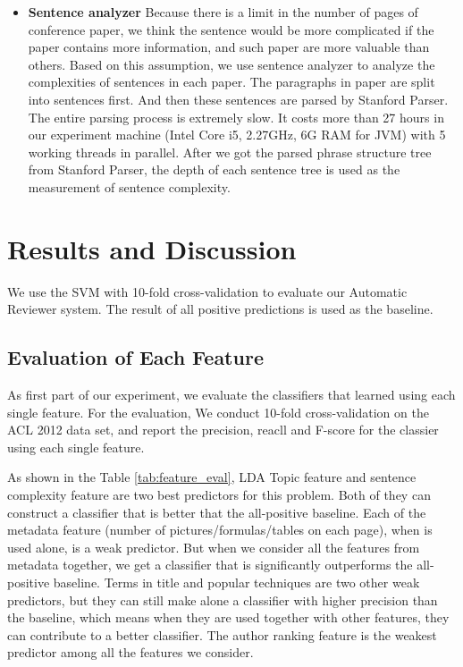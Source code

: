 \documentclass[11pt,letterpaper]{article}
\begin{document}
\begin{itemize}
\item	{\bf Sentence analyzer}
Because there is a limit in the number of pages of conference paper, we think the sentence would be more complicated if the paper contains more information, and such paper are more valuable than others. Based on this assumption, we use sentence analyzer to analyze the complexities of sentences in each paper. The paragraphs in paper are split into sentences first. And then these sentences are parsed by Stanford Parser. The entire parsing process is extremely slow. It costs more than 27 hours in our experiment machine (Intel Core i5, 2.27GHz, 6G RAM for JVM) with 5 working threads in parallel. After we got the parsed phrase structure tree from Stanford Parser, the depth of each sentence tree is used as the measurement of sentence complexity. 

\end{itemize} 









\section{Results and Discussion}
We use the SVM with 10-fold cross-validation to evaluate our Automatic Reviewer system. The result of all positive predictions is used as the baseline. 


\subsection{Evaluation of Each Feature}
\label{sec:feature_eval}
As first part of our experiment, 
we evaluate the classifiers that learned using each single feature.
For the evaluation,
We conduct 10-fold cross-validation on the ACL 2012 data set,
and report the precision, reacll and F-score for the classier using each single feature.

As shown in the Table \ref{tab:feature_eval},
LDA Topic feature and sentence complexity feature are two best predictors for this problem.
Both of they can construct a classifier that is better that the all-positive baseline.
Each of the metadata feature (number of pictures/formulas/tables on each page),
when is used alone, is a weak predictor.
But when we consider all the features from metadata together,
we get a classifier that is significantly outperforms the all-positive baseline.
Terms in title and popular techniques are two other weak predictors,
but they can still make alone a classifier with higher precision than the baseline,
which means when they are used together with other features, they can contribute to a better classifier.
The author ranking feature is the weakest predictor among all the features we consider.
\end{document}
